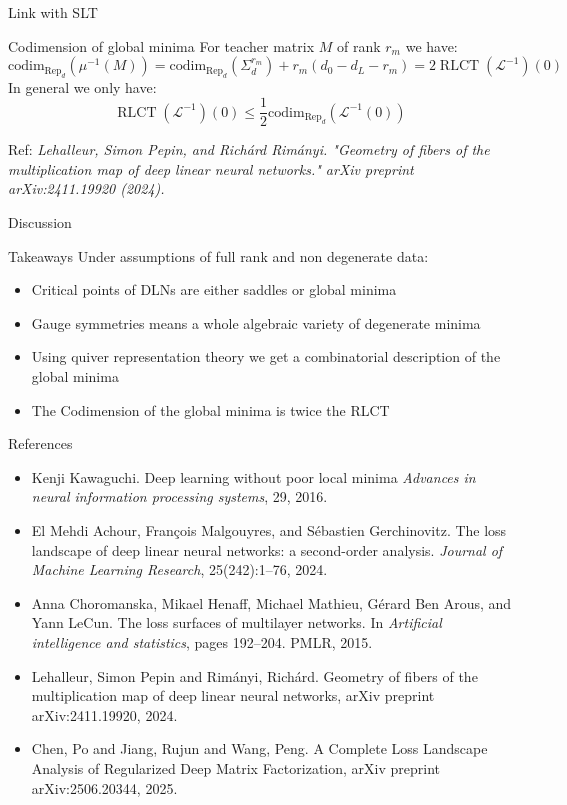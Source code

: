 \documentclass[aspectratio=169,11pt]{beamer}
\begin{document}
\begin{frame}{Link with SLT}
\begin{block}{Codimension of global minima}
For teacher matrix $M$ of rank $r_m$ we have:
    \[
    \text{codim}_{\text{Rep}_d}(\mu^{-1}(M)) = \text{codim}_{\text{Rep}_d}(\Sigma_d^{r_m}) + r_m(d_0 - d_L -r_m) = 2\operatorname{RLCT}(\mathcal{L}^{-1})(0)
    \]
In general we only have:
\[
\operatorname{RLCT}(\mathcal{L}^{-1})(0)  \leq \frac{1}{2}\text{codim}_{\text{Rep}_d}(\mathcal{L}^{-1}(0))
\]
\end{block}
Ref: \textit{Lehalleur, Simon Pepin, and Richárd Rimányi. "Geometry of fibers of the multiplication map of deep linear neural networks." arXiv preprint arXiv:2411.19920 (2024).}
\end{frame}
\begin{frame}{Discussion}
\begin{block}{Takeaways}
Under assumptions of full rank and non degenerate data:
    \begin{itemize}
        \item Critical points of DLNs are either saddles or global minima
        \item Gauge symmetries means a whole algebraic variety of degenerate minima
        \item Using quiver representation theory we get a combinatorial description of the global minima 
        \item The Codimension of the global minima is twice the RLCT
    \end{itemize}
\end{block}
\end{frame}
\begin{frame}{References}
\begin{itemize}
    \item Kenji Kawaguchi. Deep learning without poor local minima \textit{Advances in neural
information processing systems}, 29, 2016.
    \item El Mehdi Achour, François Malgouyres, and Sébastien Gerchinovitz. The loss
landscape of deep linear neural networks: a second-order analysis. \textit{Journal of
Machine Learning Research}, 25(242):1–76, 2024.
    \item Anna Choromanska, Mikael Henaff, Michael Mathieu, Gérard Ben Arous, and
Yann LeCun. The loss surfaces of multilayer networks. In \textit{Artificial intelligence
and statistics}, pages 192–204. PMLR, 2015.
    \item Lehalleur, Simon Pepin and Rim{\'a}nyi, Rich{\'a}rd. Geometry of fibers of the multiplication map of deep linear neural networks, arXiv preprint arXiv:2411.19920, 2024.
    \item Chen, Po and Jiang, Rujun and Wang, Peng. A Complete Loss Landscape Analysis of Regularized Deep Matrix Factorization, arXiv preprint arXiv:2506.20344, 2025.
\end{itemize}
\end{frame}
\end{document}
